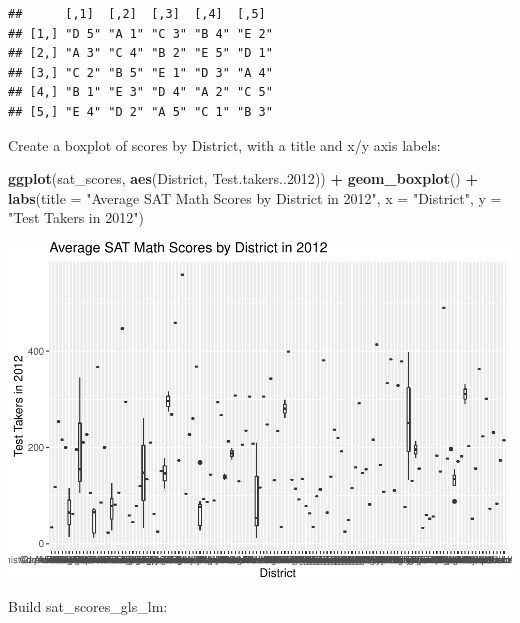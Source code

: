 \documentclass[]{book}
\newenvironment{Shaded}{\begin{snugshade}}{\end{snugshade}}
\newcommand{\DataTypeTok}[1]{\textcolor[rgb]{0.13,0.29,0.53}{#1}}
\newcommand{\DecValTok}[1]{\textcolor[rgb]{0.00,0.00,0.81}{#1}}
\newcommand{\KeywordTok}[1]{\textcolor[rgb]{0.13,0.29,0.53}{\textbf{#1}}}
\newcommand{\NormalTok}[1]{#1}
\newcommand{\OperatorTok}[1]{\textcolor[rgb]{0.81,0.36,0.00}{\textbf{#1}}}
\newcommand{\StringTok}[1]{\textcolor[rgb]{0.31,0.60,0.02}{#1}}
\begin{document}
\begin{Shaded}
\end{Shaded}

\begin{verbatim}
##      [,1]  [,2]  [,3]  [,4]  [,5] 
## [1,] "D 5" "A 1" "C 3" "B 4" "E 2"
## [2,] "A 3" "C 4" "B 2" "E 5" "D 1"
## [3,] "C 2" "B 5" "E 1" "D 3" "A 4"
## [4,] "B 1" "E 3" "D 4" "A 2" "C 5"
## [5,] "E 4" "D 2" "A 5" "C 1" "B 3"
\end{verbatim}

Create a boxplot of scores by District, with a title and x/y axis labels:

\begin{Shaded}
\begin{Highlighting}[]
\KeywordTok{ggplot}\NormalTok{(sat_scores, }\KeywordTok{aes}\NormalTok{(District, Test.takers..}\DecValTok{2012}\NormalTok{)) }\OperatorTok{+}
\StringTok{  }\KeywordTok{geom_boxplot}\NormalTok{() }\OperatorTok{+}\StringTok{ }
\StringTok{  }\KeywordTok{labs}\NormalTok{(}\DataTypeTok{title =} \StringTok{"Average SAT Math Scores by District in 2012"}\NormalTok{,}
       \DataTypeTok{x =} \StringTok{"District"}\NormalTok{,}
       \DataTypeTok{y =} \StringTok{"Test Takers in 2012"}\NormalTok{)}
\end{Highlighting}
\end{Shaded}

\includegraphics{code4stem_files/figure-latex/scores and titles-1.pdf}

Build sat\_scores\_gls\_lm:
\end{document}
